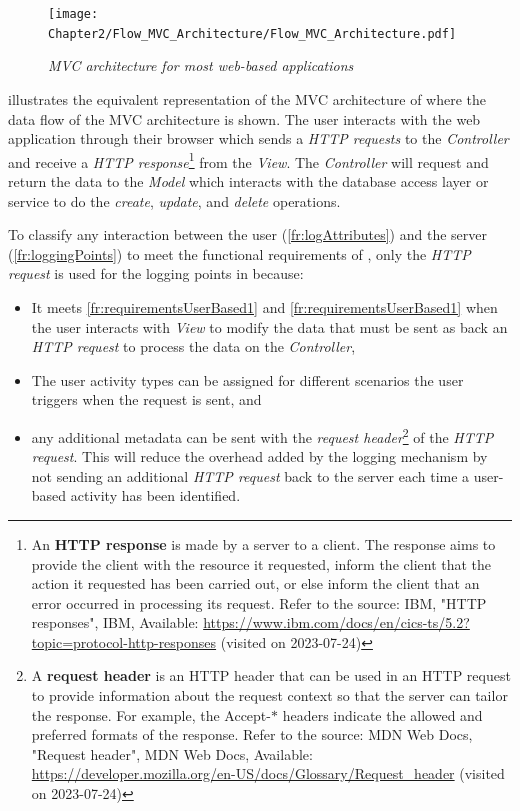 \begin{figure}[!htb]
	\centering %
	\texttt{[image: Chapter2/Flow\_MVC\_Architecture/Flow\_MVC\_Architecture.pdf]}
	\caption[MVC architecture for most web-based applications]
	{\textit{MVC architecture for most web-based applications \cite{Gu2010}}}\label{fig:ch2_flowMVC_Architecture}
\end{figure}

 illustrates the equivalent representation of the MVC architecture of  where the data flow of the MVC architecture is shown. The user interacts with the web application through their browser which sends a \textit{HTTP requests} to the \textit{Controller} and receive a \textit{HTTP response}\footnote{An \textbf{HTTP response} is made by a server to a client. The response aims to provide the client with the resource it requested, inform the client that the action it requested has been carried out, or else inform the client that an error occurred in processing its request. Refer to the source: IBM, "HTTP responses", IBM, Available: \url{https://www.ibm.com/docs/en/cics-ts/5.2?topic=protocol-http-responses} (visited on 2023-07-24)} from the \textit{View}. The \textit{Controller} will request and return the data to the \textit{Model} which interacts with the database access layer or service to do the \textit{create}, \textit{update}, and \textit{delete} operations. \par To classify any interaction between the user (\ref{fr:logAttributes}) and the server (\ref{fr:loggingPoints}) to meet the functional requirements of , only the \textit{HTTP request} is used for the logging points in  because:

\begin{itemize}
	\item It meets \ref{fr:requirementsUserBased1} and \ref{fr:requirementsUserBased1} when the user interacts with \textit{ View} to modify the data that must be sent as back an \textit{HTTP request} to process the data on the \textit{Controller},
	\item The user activity types can be assigned for different scenarios the user triggers when the request is sent, and 
	\item any additional metadata can be sent with the \textit{request header}\footnote{A \textbf{request header} is an HTTP header that can be used in an HTTP request to provide information about the request context so that the server can tailor the response. For example, the Accept-$\ast$ headers indicate the allowed and preferred formats of the response. Refer to the source: MDN Web Docs, "Request header", MDN Web Docs, Available: \url{https://developer.mozilla.org/en-US/docs/Glossary/Request_header} (visited on 2023-07-24)} of the \textit{HTTP request}. This will reduce the overhead added by the logging mechanism by not sending an additional \textit{HTTP request} back to the server each time a user-based activity has been identified.
\end{itemize}

